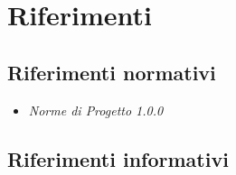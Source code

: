 \section{Riferimenti}\label{IntroduzioneRiferimenti}
\subsection{Riferimenti normativi}\label{IntroduzioneRiferimentiRiferimentiNormativi}
\begin{itemize}
	\item \textit{Norme di Progetto 1.0.0}
\end{itemize}
\subsection{Riferimenti informativi}\label{IntroduzioneRiferimentiRiferimentiInformativi}
